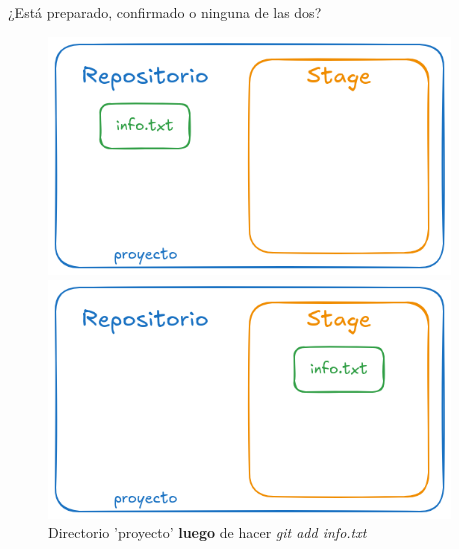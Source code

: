 \begin{frame}{¿Está preparado, confirmado o ninguna de las dos?}
    \begin{figure}
    \centering
    \begin{minipage}{0.45\textwidth}
        \centering        \includegraphics[width=0.95\textwidth]{graficos/stage_1.png} 
        \caption{Directorio 'proyecto' \textbf{antes} de hacer \textit{git add info.txt}}
    \end{minipage}\hfill
    \begin{minipage}{0.45\textwidth}
        \centering        \includegraphics[width=0.95\textwidth]{graficos/stage_2.png} 
        \caption{Directorio 'proyecto' \textbf{luego} de hacer \textit{git add info.txt}}
    \end{minipage}
\end{figure}
\end{frame}

